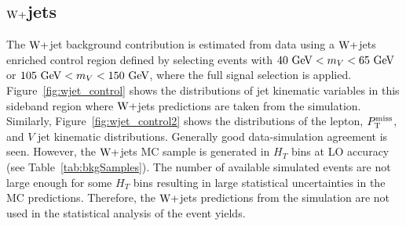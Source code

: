 \subsection{$\mathrm{W}+$jets}
The $\mathrm{W}+$jet background contribution is estimated from data using a $\mathrm{W}+$jets enriched control region defined by selecting events with $40~\mathrm{GeV} < m_{V} < 65~\mathrm{GeV}$ or $105~\mathrm{GeV} < m_{V} < 150~\mathrm{GeV}$, where the full signal selection is applied. Figure~\ref{fig:wjet_control} shows the distributions of jet kinematic variables in this sideband region where $\mathrm{W}+$jets predictions are taken from the simulation. Similarly, Figure~\ref{fig:wjet_control2} shows the distributions of the lepton, $P_\mathrm{T}^{\mathrm{miss}}$, and $V$ jet kinematic distributions. Generally good data-simulation agreement is seen. However, the $\mathrm{W}+$jets MC sample is generated in $H_{T}$ bins at LO accuracy (see Table~\ref{tab:bkgSamples}). The number of available simulated events are not large enough for some $H_{T}$ bins resulting in large statistical uncertainties in the MC predictions. Therefore, the $\mathrm{W}+$jets predictions from the simulation are not used in the statistical analysis of the event yields.

